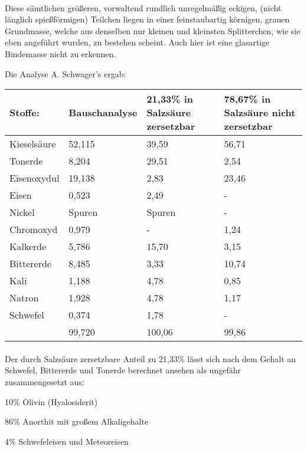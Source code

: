 \documentclass[a4paper, 11pt, oneside]{article}
\begin{document}
\paragraph{}
Diese sämtlichen größeren, vorwaltend rundlich unregelmäßig eckigen, (nicht länglich spießförmigen) Teilchen liegen in einer feinstaubartig körnigen, grauen Grundmasse, welche aus denselben nur kleinen und kleinsten Splitterchen, wie sie eben angeführt wurden, zu bestehen scheint. Auch hier ist eine glasartige Bindemasse nicht zu erkennen.

Die Analyse A. Schwager's ergab:
\begin{center}
\begin{tabular}{ |p{20mm}|p{22mm}|p{32mm}|p{32mm}| }
    \hline
    Stoffe: & Bauschanalyse & 21,33\% in Salzsäure zersetzbar & 78,67\% in Salzsäure nicht zersetzbar\\
    \hline\hline
    Kieselsäure & 52,115 & 39,59 & 56,71\\\hline
    Tonerde & 8,204 & 29,51 & 2,54\\\hline
    Eisenoxydul & 19,138 & 2,83 & 23,46\\\hline
    Eisen & 0,523 & 2,49 & -\\\hline
    Nickel & Spuren & Spuren & -\\\hline
    Chromoxyd & 0,979 & - & 1,24\\\hline
    Kalkerde & 5,786 & 15,70 & 3,15\\\hline
    Bittererde & 8,485 & 3,33 & 10,74\\\hline
    Kali & 1,188 & 4,78 & 0,85\\\hline
    Natron & 1,928 & 4,78 & 1,17\\\hline
    Schwefel & 0,374 & 1,78 & -\\\hline
    & 99,720 & 100,06 & 99,86\\
    \hline
\end{tabular}
\end{center}
\paragraph{}
Der durch Salzsäure zersetzbare Anteil zu 21,33\% lässt sich nach dem Gehalt an Schwefel, Bittererde und Tonerde berechnet ansehen als ungefähr zusammengesetzt aus:

10\% Olivin (Hyalosiderit)

86\% Anorthit mit großem Alkaligehalte

4\% Schwefeleisen und Meteoreisen
\end{document}
